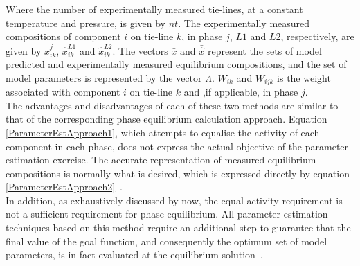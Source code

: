 
Where the number of experimentally measured tie-lines, at a constant temperature and pressure, is given by $nt$. The experimentally measured compositions of component $i$ on tie-line $k$, in phase $j$, $L1$ and $L2$, respectively, are given by $\hat{x}_{ik}^{j}$, $\hat{x}_{ik}^{L1}$ and $\hat{x}_{ik}^{L2}$. The vectors $\bar{x}$ and $\bar{\hat{x}}$ represent the sets of model predicted and experimentally measured equilibrium compositions, and the set of model parameters is represented by the vector $\bar{\Lambda}$. $W_{ik}$ and $W_{ijk}$ is the weight associated with component $i$ on tie-line $k$ and ,if applicable, in phase $j$.\\

The advantages and disadvantages of each of these two methods are similar to that of the corresponding phase equilibrium calculation approach. Equation \ref{ParameterEstApproach1}, which attempts to equalise the activity of each component in each phase, does not express the actual objective of the parameter estimation exercise. The accurate representation of measured equilibrium compositions is normally what is desired, which is expressed directly by equation \ref{ParameterEstApproach2}~\cite{LLECorrelation, BilevelOptimization2}.\\

In addition, as exhaustively discussed by now, the equal activity requirement is not a sufficient requirement for phase equilibrium. All parameter estimation techniques based on this method require an additional step to guarantee that the final value of the goal function, and consequently the optimum set of model parameters, is in-fact evaluated at the equilibrium solution~\cite{LLECorrelation, BilevelOptimization}.\\
 
